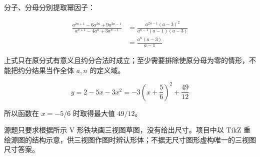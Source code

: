 \begin{answer}
分子、分母分别提取幂因子：

\nopagebreak[4]
\[
\begin{aligned}
\frac{a^{2n+1}-6a^{2n}+9a^{2n-1}}
{a^{n+1}-4a^n+3a^{n-1}}
&=\frac{a^{2n-1}(a-3)^2}{a^{n-1}(a-1)(a-3)}\\
&=\frac{a^n(a-3)}{a-1}
\end{aligned}
\]

上式只在原分式有意义且约分合法时成立；至少需要排除使原分母为零的情形，不能把约分结果当作全体 $a,n$ 的定义域。


\nopagebreak[4]
\[
y=2-5x-3x^2=-3\left(x+\frac56\right)^2+\frac{49}{12}
\]

所以函数在 $x=-5/6$ 时取得最大值 $49/12$。


源题只要求根据所示 V 形铁块画三视图草图，没有给出尺寸。项目中以 TikZ 重绘源图的结构示意，供三视图作图时辨认形体；不据无尺寸图形虚构唯一的三视图尺寸答案。











\end{answer}
